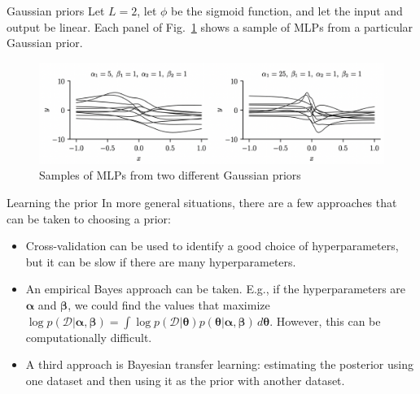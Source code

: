 \documentclass{beamer}
\begin{document}
\begin{frame}{Gaussian priors}
    Let $L = 2$, let $\phi$ be the sigmoid function, and let the input and output be linear. Each panel of Fig.~\ref{fig:mlp_priors} shows a sample of MLPs from a particular Gaussian prior.
    \begin{figure}
        \centering
        \includegraphics[width=\textwidth]{mlp_priors}
        \caption{Samples of MLPs from two different Gaussian priors}
        \label{fig:mlp_priors}
    \end{figure}
\end{frame}

\begin{frame}{Learning the prior}
    In more general situations, there are a few approaches that can be taken to choosing a prior:
    \begin{itemize}
        \item Cross-validation can be used to identify a good choice of hyperparameters, but it can be slow if there are many hyperparameters.
        \item An empirical Bayes approach can be taken. E.g., if the hyperparameters are $\boldsymbol{\alpha}$ and $\boldsymbol{\beta}$, we could find the values that maximize $\log p(\mathcal{D} | \boldsymbol{\alpha}, \boldsymbol{\beta}) = \int \log p(\mathcal{D} | \boldsymbol{\theta})p(\boldsymbol{\theta} | \boldsymbol{\alpha}, \boldsymbol{\beta})\,d\boldsymbol{\theta}$. However, this can be computationally difficult.
        \item A third approach is Bayesian transfer learning: estimating the posterior using one dataset and then using it as the prior with another dataset.
    \end{itemize}
\end{frame}
\end{document}

